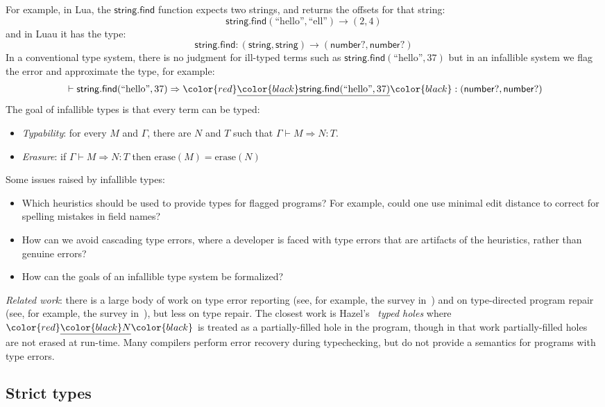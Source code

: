 \documentclass[acmsmall]{acmart}
\newcommand{\squnder}[1]{\color{red}\underline{{\color{black}#1}}\color{black}}
\newcommand{\erase}{\mathrm{erase}}
\newcommand{\NUMBER}{\mathsf{number}}
\newcommand{\STRING}{\mathsf{string}}
\newcommand{\FIND}{\mathsf{find}}
\newcommand{\strlit}[1]{\mbox{``#1''}}
\begin{document}
For example, in Lua, the $\STRING.\FIND$ function expects two strings, and returns the
offsets for that string:
\[
  \STRING.\FIND(\strlit{hello}, \strlit{ell}) \rightarrow (2, 4)
\]
and in Luau it has the type:
\[
  \STRING.\FIND : (\STRING, \STRING) \rightarrow (\NUMBER?, \NUMBER?)
\]
In a conventional type system, there is no judgment for ill-typed terms
such as $\STRING.\FIND(\strlit{hello}, 37)$ but in an infallible system we flag the error
and approximate the type, for example:
\[
  {} \vdash
  \STRING.\FIND(\strlit{hello}, 37)
  \Rightarrow
  \squnder{\STRING.\FIND(\strlit{hello}, 37)}
  :
  (\NUMBER?, \NUMBER?)
\]
The goal of infallible types is that every term can be typed:
\begin{itemize}
\item \emph{Typability}: for every $M$ and $\Gamma$,
  there are $N$ and $T$ such that $\Gamma \vdash M \Rightarrow N : T$.
\item \emph{Erasure}: if $\Gamma \vdash M \Rightarrow N : T$
  then $\erase(M) = \erase(N)$ 
\end{itemize}
Some issues raised by infallible types:
\begin{itemize}
\item Which heuristics should be used to provide types for flagged programs? For example, could one
  use minimal edit distance to correct for spelling mistakes in field names?
\item How can we avoid cascading type errors, where a developer is
  faced with type errors that are artifacts of the heuristics, rather
  than genuine errors?
\item How can the goals of an infallible type system be formalized?
\end{itemize}
\emph{Related work}:
there is a large body of work on type error reporting
(see, for example, the survey in~\cite[Ch.~3]{TopQuality})
and on type-directed program repair
(see, for example, the survey in~\cite[Ch.~3]{RepairingTypeErrors}),
but less on type repair.
The closest work is Hazel's~\cite{Hazel} \emph{typed holes}
where $\squnder{N}$ is treated as a partially-filled hole in the program,
though in that work partially-filled holes are not erased at run-time.
Many compilers perform
error recovery during typechecking, but do not provide a semantics
for programs with type errors.

\subsection{Strict types}
\end{document}
